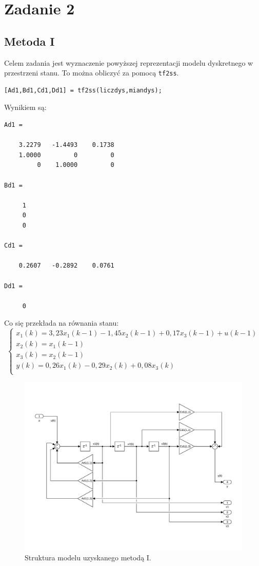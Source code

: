 \section{Zadanie 2}
\subsection{Metoda I}
Celem zadania jest wyznaczenie powyższej reprezentacji modelu dyskretnego w przestrzeni stanu. To można obliczyć za pomocą \texttt{tf2ss}.
\begin{verbatim}
[Ad1,Bd1,Cd1,Dd1] = tf2ss(liczdys,miandys);
\end{verbatim}
Wynikiem są:
\begin{verbatim}
Ad1 =

    3.2279   -1.4493    0.1738
    1.0000         0         0
         0    1.0000         0
         
Bd1 =

     1
     0
     0

Cd1 =

    0.2607   -0.2892    0.0761
    
Dd1 =

     0
\end{verbatim}
Co się przekłada na równania stanu:
\[
\left\{
\begin{array}{l}
	x_1(k)= 3,23x_1(k-1) -1,45x_2(k-1) +0,17x_3(k-1) + u(k-1) \\
	x_2(k)= x_1(k-1) \\
	x_3(k)= x_2(k-1) \\
	y(k)= 0,26x_1(k) -0,29x_2(k) + 0,08x_3(k) \\ 
\end{array}
\right.
\]
\begin{figure}[H]
\centering
 \includegraphics[width=\textwidth]{img/obj1.pdf}
\caption{Struktura modelu uzyskanego metodą I.}
\end{figure} 


